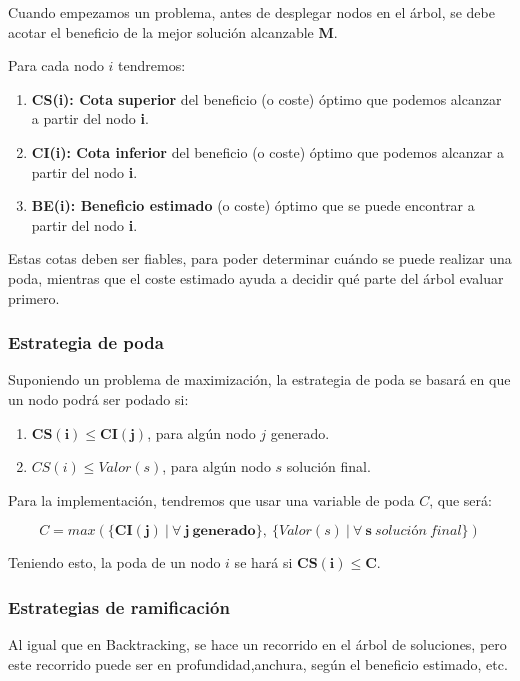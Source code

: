 \documentclass[10pt,a4paper,spanish]{report}
\theoremstyle{definition}
\theoremstyle{remark}
\begin{document}
Cuando empezamos un problema, antes de desplegar nodos en el árbol, se debe acotar el beneficio de la mejor solución alcanzable \textbf{\textcolor{coquelicot}M}.

Para cada nodo $i$ tendremos:

\begin{enumerate}[---]
    \item \textbf{CS(i): Cota superior} del beneficio (o coste) óptimo que podemos alcanzar a partir del nodo \textbf{i}.
    \item \textbf{CI(i): Cota inferior} del beneficio (o coste) óptimo que podemos alcanzar a partir del nodo \textbf{i}.
    \item \textbf{BE(i): Beneficio estimado} (o coste) óptimo que se puede encontrar a partir del nodo \textbf{i}.
\end{enumerate}

Estas cotas deben ser fiables, para poder determinar cuándo se puede realizar una poda, mientras que el coste estimado ayuda a decidir qué parte del árbol evaluar primero.

\subsubsection{\textcolor{coquelicot}Estrategia de poda}

Suponiendo un problema de maximización, la estrategia de poda se basará en que un nodo podrá ser podado si:

\begin{enumerate}[---]
    \item $\mathbf{CS(i)\leq CI(j)}$, para algún nodo $j$ generado.
    \item $CS(i) \leq Valor(s)$, para algún nodo $s$ solución final.
\end{enumerate}

Para la implementación, tendremos que usar una variable de poda $C$, que será:

$$ C = max(\{\mathbf{CI(j)~|~\forall~\mathbf{j}~\text{generado}}\},~\{Valor(s)~|~\forall~\mathbf{s}~solución~final\})$$

Teniendo esto, la poda de un nodo $i$ se hará si $\mathbf{CS(i)\leq C}$.

\subsubsection{\textcolor{coquelicot}Estrategias de ramificación}

Al igual que en Backtracking, se hace un recorrido en el árbol de soluciones, pero este recorrido puede ser en profundidad,anchura, según el beneficio estimado, etc.
\end{document}
